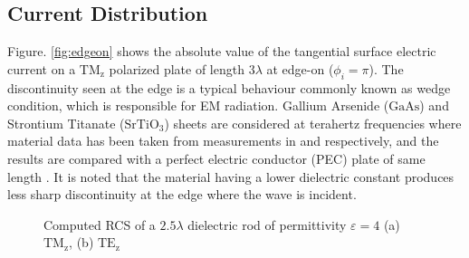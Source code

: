 \documentclass{ieeeaccess}
\newcommand{\E}{\varepsilon}  %
\renewcommand{\^}{\hat}  %
\begin{document}
\subsection{Current Distribution}
%
Figure. \ref{fig:edgeon} shows the absolute value of the tangential surface electric current on a $\mathrm{TM_z}$ polarized plate of length $3 \lambda$ at edge-on ($\phi_i = \pi$). The discontinuity seen at the edge is a typical behaviour commonly known as wedge condition, which is responsible for EM radiation. Gallium Arsenide ($\mathrm{GaAs}$) and Strontium Titanate ($\mathrm{SrTiO_3}$) sheets are considered at terahertz frequencies where material data has been taken from measurements in \cite{burke2000} and \cite{herranz2012high} respectively, and the results are compared with a perfect electric conductor (PEC) plate of same length \cite{senior1979backscattering}. It is noted that the material having a lower dielectric constant produces less sharp discontinuity at the edge where the wave is incident.
%
\begin{figure}[!t]
  \centering
  \caption{Computed RCS of a $2.5 \lambda$ dielectric rod of permittivity $\E=4$ (a) $\mathrm{TM_z}$, (b) $\mathrm{TE_z}$}
  \label{fig:RCS_richmodn}
\end{figure}
%
\end{document}
